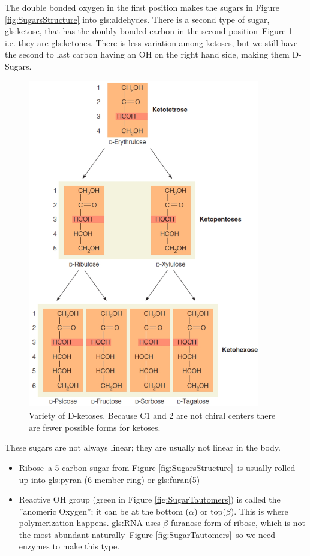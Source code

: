 \documentclass[]{article}
\begin{document}
The double bonded oxygen in the first position makes the sugars in Figure \ref{fig:SugarsStructure} into \glspl{gls:aldehyde}. There is a second type of sugar, \gls{gls:ketose}, that has the doubly bonded carbon in the second position--Figure \ref {fig:ketoses}--i.e. they are \glspl{gls:ketone}. There is less variation among ketoses, but we still have the second to last carbon having an OH on the right hand side, making them D-Sugars.
\begin{figure}[H]
	\caption[Variety of D-ketoses]{Variety of D-ketoses. Because C1 and 2 are not chiral centers there are fewer possible forms for ketoses.}\label{fig:ketoses} 
	\includegraphics[width=0.9\textwidth]{ketoses}
\end{figure}

These sugars are not always linear; they are usually not linear in the body.

\begin{itemize}
	\item Ribose--a 5 carbon sugar from Figure \ref{fig:SugarsStructure}--is usually rolled up into \gls{gls:pyran} (6 member ring) or \gls{gls:furan}(5)
	\item Reactive OH group (green in Figure \ref{fig:SugarTautomers}) is called the ''anomeric Oxygen''; it can be at the bottom ($\alpha$) or top($\beta$). This is where polymerization happens. \gls{gls:RNA} uses $\beta$-furanose form of ribose, which is not the most abundant naturally--Figure \ref{fig:SugarTautomers}--so we need enzymes to make this type.
\end{itemize}
\end{document}
